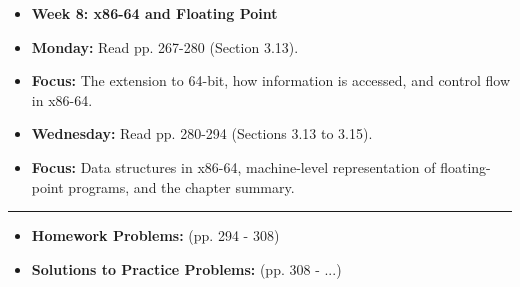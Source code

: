 \begin{itemize}
  \item \textbf{Week 8: x86-64 and Floating Point}
  \item \textbf{Monday:} Read pp. 267-280 (Section 3.13).
  \item \textbf{Focus:} The extension to 64-bit, how information is accessed, and control flow in x86-64.
  \item \textbf{Wednesday:} Read pp. 280-294 (Sections 3.13 to 3.15).
  \item \textbf{Focus:} Data structures in x86-64, machine-level representation of floating-point programs, and the chapter summary.

\end{itemize}
\noindent\rule{\textwidth}{0.4pt}
\begin{itemize}
  \item \textbf{Homework Problems:} (pp. 294 - 308)
  \item \textbf{Solutions to Practice Problems:} (pp. 308 - ...)

\end{itemize}